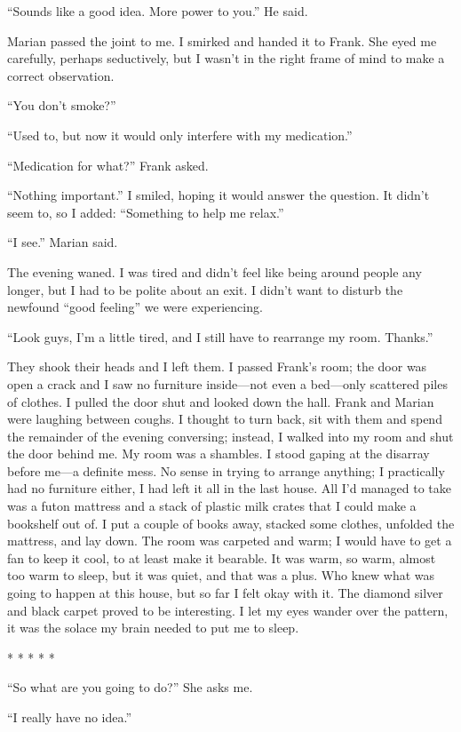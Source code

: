 \documentclass[
]{article}
\begin{document}
``Sounds like a good idea. More power to you.'' He said.

Marian passed the joint to me. I smirked and handed it to Frank. She
eyed me carefully, perhaps seductively, but I wasn't in the right frame
of mind to make a correct observation.

``You don't smoke?''

``Used to, but now it would only interfere with my medication.''

``Medication for what?'' Frank asked.

``Nothing important.'' I smiled, hoping it would answer the question. It
didn't seem to, so I added: ``Something to help me relax.''

``I see.'' Marian said.

The evening waned. I was tired and didn't feel like being around people
any longer, but I had to be polite about an exit. I didn't want to
disturb the newfound ``good feeling'' we were experiencing.

``Look guys, I'm a little tired, and I still have to rearrange my room.
Thanks.''

They shook their heads and I left them. I passed Frank's room; the door
was open a crack and I saw no furniture inside---not even a bed---only
scattered piles of clothes. I pulled the door shut and looked down the
hall. Frank and Marian were laughing between coughs. I thought to turn
back, sit with them and spend the remainder of the evening conversing;
instead, I walked into my room and shut the door behind me. My room was
a shambles. I stood gaping at the disarray before me---a definite mess.
No sense in trying to arrange anything; I practically had no furniture
either, I had left it all in the last house. All I'd managed to take was
a futon mattress and a stack of plastic milk crates that I could make a
bookshelf out of. I put a couple of books away, stacked some clothes,
unfolded the mattress, and lay down. The room was carpeted and warm; I
would have to get a fan to keep it cool, to at least make it bearable.
It was warm, so warm, almost too warm to sleep, but it was quiet, and
that was a plus. Who knew what was going to happen at this house, but so
far I felt okay with it. The diamond silver and black carpet proved to
be interesting. I let my eyes wander over the pattern, it was the solace
my brain needed to put me to sleep.

* * * * *

``So what are you going to do?'' She asks me.

``I really have no idea.''
\end{document}
